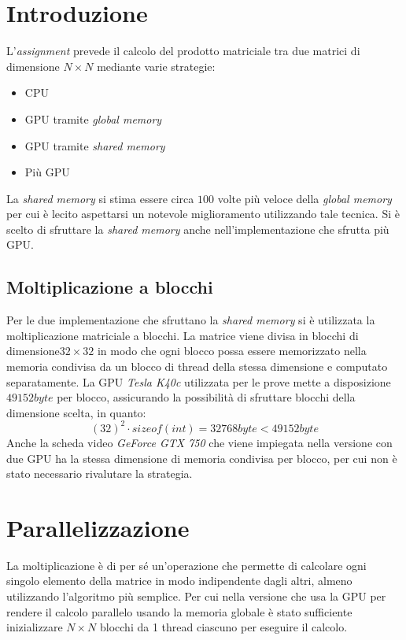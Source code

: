 \documentclass[12pt]{article}
\begin{document}
\maketitle
\newpage

\section{Introduzione}
L'\emph{assignment} prevede il calcolo del prodotto matriciale tra due matrici di dimensione $N \times N$ mediante varie strategie:
\begin{itemize}
\item CPU
\item GPU tramite \emph{global memory}
\item GPU tramite \emph{shared memory}
\item Più GPU
\end{itemize}

La \emph{shared memory} si stima essere circa $100$ volte più veloce della \emph{global memory} per cui è lecito aspettarsi un notevole miglioramento utilizzando tale tecnica. Si è scelto di sfruttare la \emph{shared memory} anche nell'implementazione che sfrutta più GPU.

\subsection{Moltiplicazione a blocchi}
Per le due implementazione che sfruttano la \emph{shared memory} si è utilizzata la moltiplicazione matriciale a blocchi. La matrice viene divisa in blocchi di dimensione$ 32 \times 32 $ in modo che ogni blocco possa essere memorizzato nella memoria condivisa da un blocco di thread della stessa dimensione e computato separatamente.  La GPU \emph{Tesla K40c} utilizzata per le prove mette a disposizione $49152 byte$ per blocco, assicurando la possibilità di sfruttare blocchi della dimensione scelta, in quanto:
$$ (32)^2 \cdot sizeof(int) = 32768 byte < 49152 byte $$
Anche la scheda video \emph{GeForce GTX 750} che viene impiegata nella versione con due GPU ha la stessa dimensione di memoria condivisa per blocco, per cui non è stato necessario rivalutare la strategia.

\section{Parallelizzazione}
La moltiplicazione è di per sé un'operazione che permette di calcolare ogni singolo elemento della matrice in modo indipendente dagli altri, almeno utilizzando l'algoritmo più semplice. Per cui nella versione che usa la GPU per rendere il calcolo parallelo usando la memoria globale è stato sufficiente inizializzare $N \times N$ blocchi da 1 thread ciascuno per eseguire il calcolo.
\end{document}
